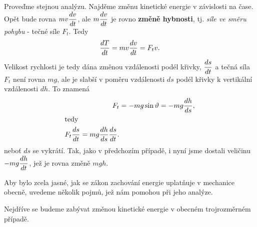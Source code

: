     Proveďme stejnou analýzu. Najděme změnu kinetické energie v závislosti na čase. Opět bude    
    rovna \(mv\dfrac{d v}{d t}\), ale \(m\dfrac{d v}{d t}\) je rovno \textbf{změně hybnosti}, tj. \emph{síle ve 
    směru pohybu} - tečné síle \(F_t\). Tedy
    \begin{equation}\label{FYZ:eq028}
      \dfrac{d T}{d t} = mv\dfrac{d v}{d t} = F_tv.
    \end{equation}
    Velikost rychlosti je tedy dána změnou vzdálenosti podél křivky, \(\dfrac{d s}{d t}\) a tečná síla 
    \(F_t\) není rovna \(mg\), ale je slabší v poměru vzdálenosti \(ds\) podél křivky k vertikální 
    vzdálenosti \(dh\). To znamená
    \begin{align}
      F_t &= -mg\sin\vartheta = -mg\dfrac{d h}{d s},  \nonumber \\
      \shortintertext{tedy}
      F_t\dfrac{d s}{d t} = mg\dfrac{d h}{d s}\dfrac{d s}{d t}.   \label{FYZ:eq029}
    \end{align}
    neboť \(ds\) se vykrátí. Tak, jako v předchozím případě, i nyní jsme dostali veličinu \(- 
    mg\dfrac{d h}{d t}\), jež je rovna změně \(mgh\).
    
    Aby bylo zcela jasné, jak se zákon zachování energie uplatňuje v mechanice obecně, uvedeme    
    několik pojmů, jež nám pomohou při jeho analýze.
    
    Nejdříve se budeme zabývat změnou kinetické energie v obecném trojrozměrném případě.
    
